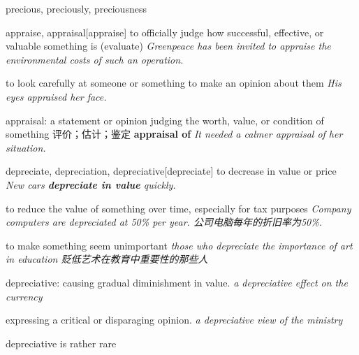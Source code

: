 \begin{RefWord}{precious, preciously, preciousness}
\end{RefWord}

\begin{RefWord}{appraise, appraisal}[appraise]
    to officially judge how successful, effective, or valuable something is (evaluate)
    \textit{Greenpeace has been invited to appraise the environmental costs of such an operation.}

    to look carefully at someone or something to make an opinion about them
    \textit{His eyes appraised her face.}

    appraisal: a statement or opinion judging the worth, value, or condition of something 评价；估计；鉴定
    \textbf{appraisal of}
    \textit{It needed a calmer appraisal of her situation.}
\end{RefWord}

\begin{RefWord}{depreciate, depreciation, depreciative}[depreciate]
    to decrease in value or price
    \textit{New cars \textbf{depreciate in value} quickly.}

    to reduce the value of something over time, especially for tax purposes
    \textit{Company computers are depreciated at 50\% per year. 公司电脑每年的折旧率为50\%.}

    to make something seem unimportant
    \textit{those who depreciate the importance of art in education 贬低艺术在教育中重要性的那些人}

    depreciative: causing gradual diminishment in value.
    \textit{a depreciative effect on the currency}
    
    expressing a critical or disparaging opinion.
    \textit{a depreciative view of the ministry}

    \begin{remark}
        depreciative is rather rare
    \end{remark}
\end{RefWord}